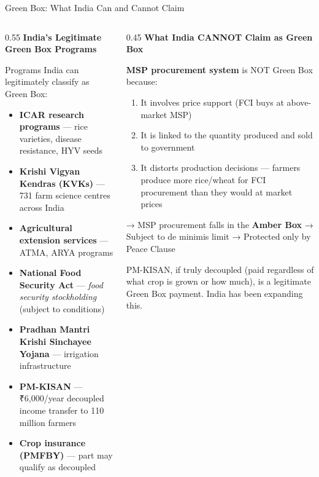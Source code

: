 \documentclass[
  ignorenonframetext,
  aspectratio=169,
]{beamer}
\makeatletter
\providecommand{\tightlist}{%
  \setlength{\itemsep}{0pt}\setlength{\parskip}{0pt}}
\let\quarto@originallabel\label
\DeclareRobustCommand*{\label}[1]{\quarto@originallabel{#1}}
\makeatother
\begin{document}
\begin{frame}{Green Box: What India Can and Cannot Claim}
\label{green-box-what-india-can-and-cannot-claim}
\begin{columns}[T]
\begin{column}{0.55\linewidth}
\textbf{India's Legitimate Green Box Programs}

Programs India can legitimately classify as Green Box:

\begin{itemize}
\tightlist
\item
  \textbf{ICAR research programs} --- rice varieties, disease
  resistance, HYV seeds
\item
  \textbf{Krishi Vigyan Kendras (KVKs)} --- 731 farm science centres
  across India
\item
  \textbf{Agricultural extension services} --- ATMA, ARYA programs
\item
  \textbf{National Food Security Act} --- \emph{food security
  stockholding} (subject to conditions)
\item
  \textbf{Pradhan Mantri Krishi Sinchayee Yojana} --- irrigation
  infrastructure
\item
  \textbf{PM-KISAN} --- ₹6,000/year decoupled income transfer to 110
  million farmers
\item
  \textbf{Crop insurance (PMFBY)} --- part may qualify as decoupled
\end{itemize}
\end{column}

\begin{column}{0.45\linewidth}
\textbf{What India CANNOT Claim as Green Box}

\textbf{MSP procurement system} is NOT Green Box because:

\begin{enumerate}
\tightlist
\item
  It involves price support (FCI buys at above-market MSP)
\item
  It is linked to the quantity produced and sold to government
\item
  It distorts production decisions --- farmers produce more rice/wheat
  for FCI procurement than they would at market prices
\end{enumerate}

→ MSP procurement falls in the \textbf{Amber Box} → Subject to de
minimis limit → Protected only by Peace Clause

PM-KISAN, if truly decoupled (paid regardless of what crop is grown or
how much), is a legitimate Green Box payment. India has been expanding
this.
\end{column}
\end{columns}
\end{frame}
\end{document}
